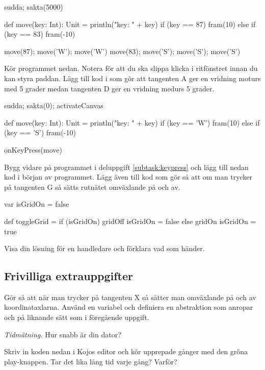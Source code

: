 \begin{Code}
sudda; sakta(5000)

def move(key: Int): Unit = {
  println("key: " + key)
  if (key == 87) fram(10)
  else if (key == 83) fram(-10)
}

move(87); move('W'); move('W')
move(83); move('S'); move('S'); move('S')
\end{Code}

\Subtask \label{subtask:keypress}  Kör programmet nedan. Notera  för att du ska slippa klicka i ritfönstret innan du kan styra paddan. Lägg till kod i  som gör att tangenten A ger en vridning moturs med 5 grader medan tangenten D ger en vridning medurs 5 grader.

\begin{Code}
sudda; sakta(0); activateCanvas

def move(key: Int): Unit = {
  println("key: " + key)
  if (key == 'W') fram(10)
  else if (key == 'S') fram(-10)
}

onKeyPress(move)
\end{Code}

\Subtask Bygg vidare på programmet i deluppgift \ref{subtask:keypress} och lägg till nedan kod i början av programmet. Lägg även till kod som gör så att om man trycker på tangenten G så sätts rutnätet omväxlande på och av.

\begin{Code}
var isGridOn = false

def toggleGrid =
  if (isGridOn) {
    gridOff
    isGridOn = false
  } else {
    gridOn
    isGridOn = true
  }
\end{Code}

\Subtask\Checkpoint Visa din lösning för en handledare och förklara vad som händer.

\subsection{Frivilliga extrauppgifter}

\Task Gör så att när man trycker på tangenten X så sätter man omväxlande på och av koordinataxlarna. Använd en variabel  och definiera en abstraktion  som anropar  och  på liknande sätt som i föregående uppgift. 


\Task \label{task:measuretime} \emph{Tidmätning.} Hur snabb är din dator?

\Subtask \label{task:timer} Skriv in koden nedan i Kojos editor och kör upprepade gånger med den gröna play-knappen. Tar det lika lång tid varje gång? Varför?

